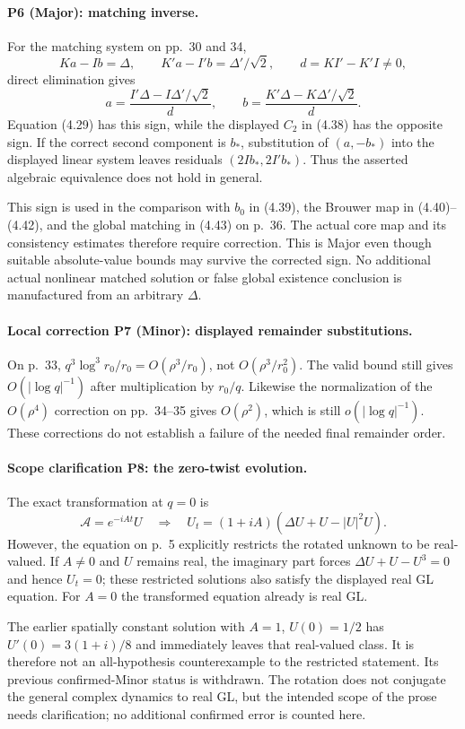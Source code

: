 \documentclass[10pt]{article}
\begin{document}
\paragraph*{P6 (Major): matching inverse.}\mbox{}\par
For the matching system on pp. 30 and 34, \[Ka-Ib=\Delta,\qquad K'a-I'b=\Delta'/\sqrt2,\qquad
 d=KI'-K'I\ne0,\] direct elimination gives \[a=\frac{I'\Delta-I\Delta'/\sqrt2}{d},\qquad
 b=\frac{K'\Delta-K\Delta'/\sqrt2}{d}.\] Equation (4.29) has this sign, while the displayed \(C_2\) in (4.38) has the opposite sign. If the correct second component is \(b_*\), substitution of \((a,-b_*)\) into the displayed linear system leaves residuals \((2Ib_*,2I'b_*)\). Thus the asserted algebraic equivalence does not hold in general.\par
This sign is used in the comparison with \(b_0\) in (4.39), the Brouwer map in (4.40)–(4.42), and the global matching in (4.43) on p. 36. The actual core map and its consistency estimates therefore require correction. This is Major even though suitable absolute-value bounds may survive the corrected sign. No additional actual nonlinear matched solution or false global existence conclusion is manufactured from an arbitrary \(\Delta\).\par
\paragraph*{Local correction P7 (Minor): displayed remainder substitutions.}\mbox{}\par
On p. 33, \(q^3\log^3r_0/r_0=O(\rho^3/r_0)\), not \(O(\rho^3/r_0^2)\). The valid bound still gives \(O(|\log q|^{-1})\) after multiplication by \(r_0/q\). Likewise the normalization of the \(O(\rho^4)\) correction on pp. 34–35 gives \(O(\rho^2)\), which is still \(o(|\log q|^{-1})\). These corrections do not establish a failure of the needed final remainder order.\par
\paragraph*{Scope clarification P8: the zero-twist evolution.}\mbox{}\par
The exact transformation at \(q=0\) is \[\mathcal{A}=e^{-iA t}U
 \quad\Longrightarrow\quad
 U_t=(1+iA)(\Delta U+U-|U|^2U).\] However, the equation on p. 5 explicitly restricts the rotated unknown to be real-valued. If \(A\ne0\) and \(U\) remains real, the imaginary part forces \(\Delta U+U-U^3=0\) and hence \(U_t=0\); these restricted solutions also satisfy the displayed real GL equation. For \(A=0\) the transformed equation already is real GL.\par
The earlier spatially constant solution with \(A=1\), \(U(0)=1/2\) has \(U'(0)=3(1+i)/8\) and immediately leaves that real-valued class. It is therefore not an all-hypothesis counterexample to the restricted statement. Its previous confirmed-Minor status is withdrawn. The rotation does not conjugate the general complex dynamics to real GL, but the intended scope of the prose needs clarification; no additional confirmed error is counted here.\par
\end{document}
